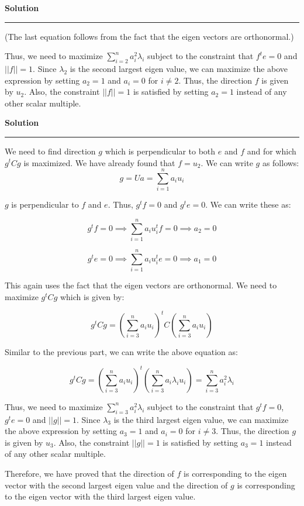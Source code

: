 \documentclass[a4paper,12pt]{article}
\newenvironment{solution}[2][]{%
    \begin{mdframed}[linecolor=blue!70!black, linewidth=2pt, roundcorner=10pt, backgroundcolor=yellow!10!white, skipabove=12pt, skipbelow=12pt]%
        \textbf{\large #2}
        \par\noindent\rule{\textwidth}{0.4pt}
}{
    \end{mdframed}
}
\begin{document}
\begin{solution}{Solution}
(The last equation follows from the fact that the eigen vectors are orthonormal.)

Thus, we need to maximize $\sum_{i=2}^n a_{i}^{2}\lambda_{i}$ subject to the constraint that $f^{t}e = 0$ and $||f|| = 1$. Since $\lambda_2$ is the second largest eigen value, we can maximize the above expression by setting $a_2 = 1$ and $a_i = 0$ for $i \neq 2$. Thus, the direction $f$ is given by $u_2$. Also, the constraint $||f|| = 1$ is satisfied by setting $a_2 = 1$ instead of any other scalar multiple.
\end{solution}

\clearpage

\begin{solution}{Solution}
  We need to find direction $g$ which is perpendicular to both $e$ and $f$ and for which $g^{t}Cg$ is maximized. We have already found that $f = u_{2}$. We can write $g$ as follows:
  \begin{equation}
    g = Ua = \sum_{i=1}^{n} a_{i}u_{i}
  \end{equation}

$g$ is perpendicular to $f$ and $e$. Thus, $g^{t}f = 0$ and $g^{t}e = 0$. We can write these as:

\begin{equation}
  g^{t}f = 0 \implies \sum_{i=1}^{n} a_{i}u_{i}^{t}f = 0 \implies a_2 = 0
\end{equation}

\begin{equation}
  g^{t}e = 0 \implies \sum_{i=1}^{n} a_{i}u_{i}^{t}e = 0 \implies a_1 = 0
\end{equation}

This again uses the fact that the eigen vectors are orthonormal. We need to maximize $g^{t}Cg$ which is given by:

\begin{equation}
  g^{t}Cg = {\left(\sum_{i=3}^n a_{i}u_{i}\right)}^t C\left(\sum_{i=3}^n a_{i}u_{i}\right)
\end{equation}

Similar to the previous part, we can write the above equation as:

\begin{equation}
  g^{t}Cg = {\left(\sum_{i=3}^n a_{i}u_{i}\right)}^t \left(\sum_{i=3}^n a_i\lambda_{i}u_{i}\right) = \sum_{i=3}^n a_{i}^{2}\lambda_{i}
\end{equation}

Thus, we need to maximize $\sum_{i=3}^n a_i^2\lambda_i$ subject to the constraint that $g^{t}f = 0$, $g^{t}e = 0$ and $||g|| = 1$. Since $\lambda_3$ is the third largest eigen value, we can maximize the above expression by setting $a_3 = 1$ and $a_i = 0$ for $i \neq 3$. Thus, the direction $g$ is given by $u_3$. Also, the constraint $||g|| = 1$ is satisfied by setting $a_3 = 1$ instead of any other scalar multiple.


Therefore, we have proved that the direction of $f$ is corresponding to the eigen vector with the second largest eigen value and the direction of $g$ is corresponding to the eigen vector with the third largest eigen value.
\end{solution}
\end{document}
